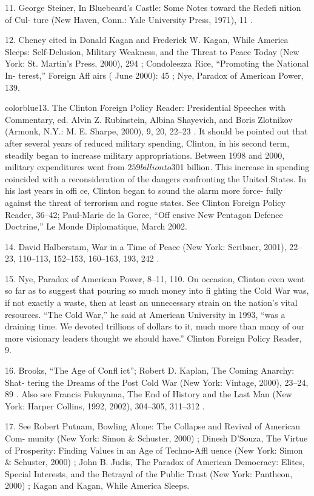 	{\color{blue}11}. George Steiner, In Bluebeard’s Castle: Some Notes toward the Redefi nition of Cul- ture (New Haven, Conn.: Yale University Press, 1971), 11 .


	{\color{blue}12}. Cheney cited in Donald Kagan and Frederick W. Kagan, While America Sleeps: Self-Delusion, Military Weakness, and the Threat to Peace Today (New York: St. Martin’s Press, 2000), 294 ; Condoleezza Rice, “Promoting the National In- terest,” Foreign Aff airs ( June 2000): 45 ; Nye, Paradox of American Power, 139.


	{color{blue}13}. The Clinton Foreign Policy Reader: Presidential Speeches with Commentary, ed. Alvin Z. Rubinstein, Albina Shayevich, and Boris Zlotnikov (Armonk, N.Y.: M. E. Sharpe, 2000), 9, 20, 22–23 . It should be pointed out that after several years of reduced military spending, Clinton, in his second term, steadily began to increase military appropriations. Between 1998 and 2000, military expenditures went from $259 billion to $301 billion. This increase in spending coincided with a reconsideration of the dangers confronting the United States. In his last years in offi ce, Clinton began to sound the alarm more force- fully against the threat of terrorism and rogue states. See Clinton Foreign Policy Reader, 36–42; Paul-Marie de la Gorce, “Off ensive New Pentagon Defence Doctrine,” Le Monde Diplomatique, March 2002.


	{\color{blue}14}. David Halberstam, War in a Time of Peace (New York: Scribner, 2001), 22–23, 110–113, 152–153, 160–163, 193, 242 .


	{\color{blue}15}. Nye, Paradox of American Power, 8–11, 110. On occasion, Clinton even went so far as to suggest that pouring so much money into fi ghting the Cold War was, if not exactly a waste, then at least an unnecessary strain on the nation’s vital resources. “The Cold War,” he said at American University in 1993, “was a draining time. We devoted trillions of dollars to it, much more than many of our more visionary leaders thought we should have.” Clinton Foreign Policy Reader, 9.


	{\color{blue}16}. Brooks, “The Age of Confl ict”; Robert D. Kaplan, The Coming Anarchy: Shat- tering the Dreams of the Post Cold War (New York: Vintage, 2000), 23–24, 89 . Also see Francis Fukuyama, The End of History and the Last Man (New York: Harper Collins, 1992, 2002), 304–305, 311–312 .


	{\color{blue}17}. See Robert Putnam, Bowling Alone: The Collapse and Revival of American Com- munity (New York: Simon & Schuster, 2000) ; Dinesh D’Souza, The Virtue of Prosperity: Finding Values in an Age of Techno-Affl uence (New York: Simon & Schuster, 2000) ; John B. Judis, The Paradox of American Democracy: Elites, Special Interests, and the Betrayal of the Public Trust (New York: Pantheon, 2000) ; Kagan and Kagan, While America Sleeps.


